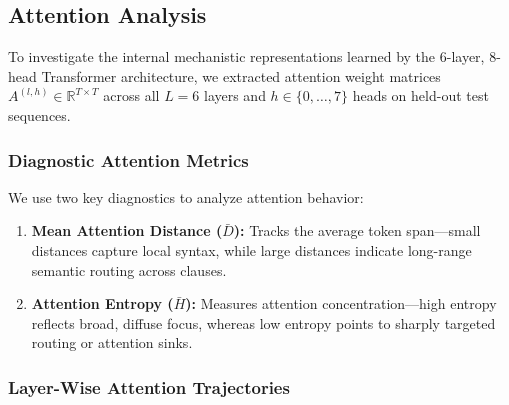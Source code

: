 \documentclass[8pt]{article}
\begin{document}
\subsection{Attention Analysis}
\label{subsec:attention}

To investigate the internal mechanistic representations learned by the 6-layer, 8-head Transformer architecture, we extracted attention weight matrices $A^{(l, h)} \in \mathbb{R}^{T \times T}$ across all $L = 6$ layers and $h \in \{0, \dots, 7\}$ heads on held-out test sequences.

\subsubsection{Diagnostic Attention Metrics}
We use two key diagnostics to analyze attention behavior:
\begin{enumerate}
    \item \textbf{Mean Attention Distance ($\bar{D}$):} Tracks the average token span—small distances capture local syntax, while large distances indicate long-range semantic routing across clauses.
    \item \textbf{Attention Entropy ($\bar{H}$):} Measures attention concentration—high entropy reflects broad, diffuse focus, whereas low entropy points to sharply targeted routing or attention sinks.
\end{enumerate}

\subsubsection{Layer-Wise Attention Trajectories}
\end{document}

